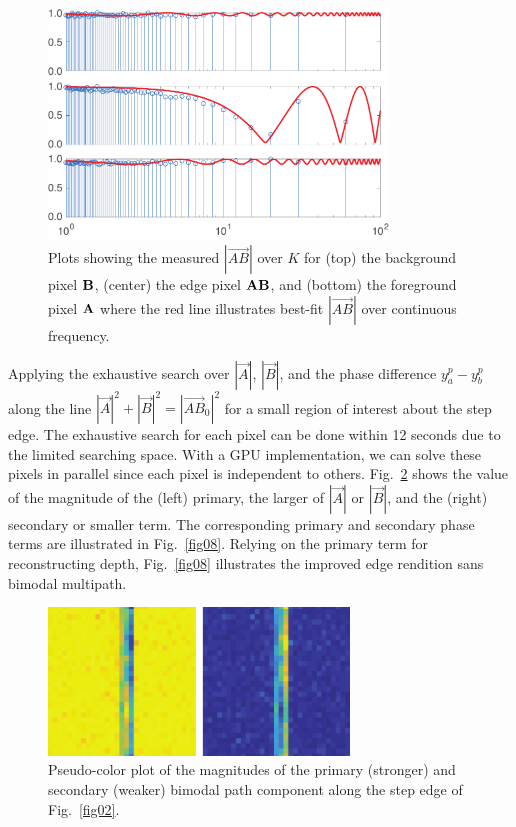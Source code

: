 \documentclass[10pt]{article}
\begin{document}
\begin{figure}[!t]
\centering\includegraphics[width=3.55in]{Figures/figure06}
\caption{Plots showing the measured $|\vec{AB}|$ over $K$ for (top) the background pixel ${\bf B}$, (center) the edge pixel ${\bf AB}$, and (bottom) the foreground pixel ${\bf A}$ where the red line illustrates best-fit $|\vec{AB}|$ over continuous frequency. }
\label{fig06}
\end{figure}

Applying the exhaustive search over $|\vec{A}|$, $|\vec{B}|$, and the phase difference $y^p_a - y^p_b$ along the line $|\vec{A}|^2 + |\vec{B}|^2 = |\vec{AB}_{0}|^2$ for a small region of interest about the step edge. The exhaustive search for each pixel can be done within 12 seconds due to the limited searching space. With a GPU implementation, we can solve these pixels in parallel since each pixel is independent to others. Fig.~\ref{fig07} shows the value of the magnitude of the (left) primary, the larger of $|\vec{A}|$ or $|\vec{B}|$, and the (right) secondary or smaller term.  The corresponding primary and secondary phase terms are illustrated in Fig.~\ref{fig08}. Relying on the primary term for reconstructing depth, Fig.~\ref{fig08} illustrates the improved edge rendition sans bimodal multipath.

\begin{figure}[!t]
\centering\includegraphics[width=3.15in]{Figures/figure07}
\caption{Pseudo-color plot of the magnitudes of the primary (stronger) and secondary (weaker) bimodal path component along the step edge of Fig.~\ref{fig02}.}
\label{fig07}
\end{figure}
\end{document}
